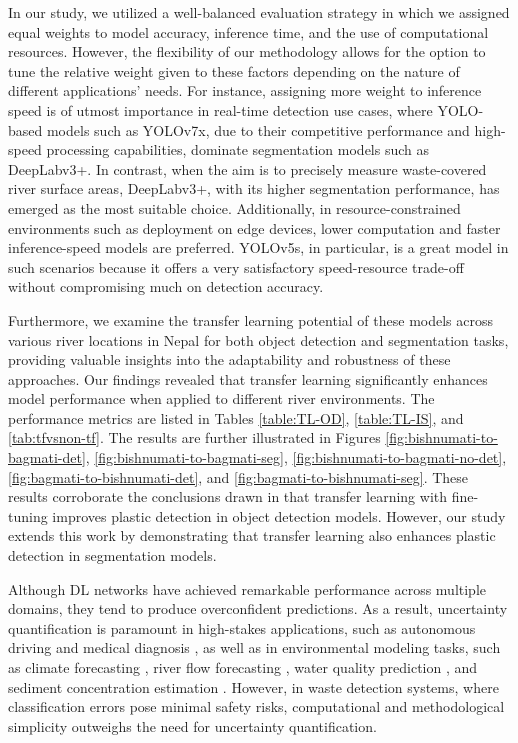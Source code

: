 \documentclass{ieeeaccess}
\begin{document}
In our study, we utilized a well-balanced evaluation strategy in which we assigned equal weights to model accuracy, inference time, and the use of computational resources. However, the flexibility of our methodology allows for the option to tune the relative weight given to these factors depending on the nature of different applications' needs. For instance, assigning more weight to inference speed is of utmost importance in real-time detection use cases, where YOLO-based models such as YOLOv7x, due to their competitive performance and high-speed processing capabilities, dominate segmentation models such as DeepLabv3+. In contrast, when the aim is to precisely measure waste-covered river surface areas, DeepLabv3+, with its higher segmentation performance, has emerged as the most suitable choice. Additionally, in resource-constrained environments such as deployment on edge devices, lower computation and faster inference-speed models are preferred. YOLOv5s, in particular, is a great model in such scenarios because it offers a very satisfactory speed-resource trade-off without compromising much on detection accuracy.

Furthermore, we examine the transfer learning potential of these models across various river locations in Nepal for both object detection and segmentation tasks, providing valuable insights into the adaptability and robustness of these approaches. Our findings revealed that transfer learning significantly enhances model performance when applied to different river environments. The performance metrics are listed in Tables \ref{table:TL-OD}, \ref{table:TL-IS}, and \ref{tab:tfvsnon-tf}. The results are further illustrated in Figures \ref{fig:bishnumati-to-bagmati-det}, \ref{fig:bishnumati-to-bagmati-seg}, \ref{fig:bishnumati-to-bagmati-no-det}, \ref{fig:bagmati-to-bishnumati-det}, and \ref{fig:bagmati-to-bishnumati-seg}. These results corroborate the conclusions drawn in \cite{Maharjan2022DetectionOR} that transfer learning with fine-tuning improves plastic detection in object detection models. However, our study extends this work by demonstrating that transfer learning also enhances plastic detection in segmentation models.

Although DL networks have achieved remarkable performance across multiple domains, they tend to produce overconfident predictions. As a result, uncertainty quantification is paramount in high-stakes applications, such as autonomous driving and medical diagnosis \cite{he2023survey}, as well as in environmental modeling tasks, such as climate forecasting \cite{donnelly2024forecasting}, river flow forecasting \cite{khosravi2024daily}, water quality prediction \cite{khosravi2025enhanced}, and sediment concentration estimation \cite{shadkani2025prediction}. However, in waste detection systems, where classification errors pose minimal safety risks, computational and methodological simplicity outweighs the need for uncertainty quantification.
\end{document}
